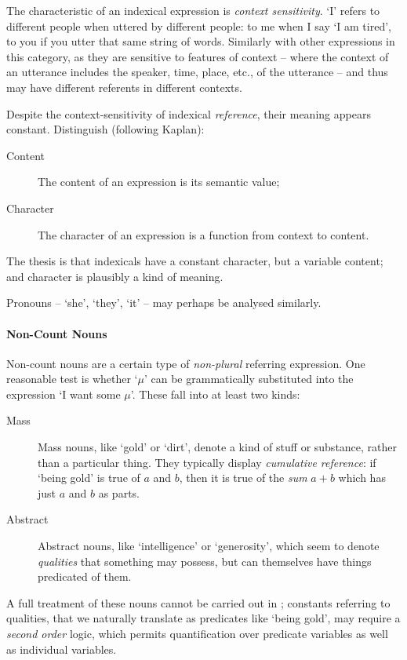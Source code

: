 The characteristic of an indexical expression is \emph{context sensitivity}. `I' refers to different people when uttered by different people: to me when I say `I am tired', to you if you utter that same string of words. Similarly with other expressions in this category, as they are sensitive to features of context – where the context of an utterance includes the speaker, time, place, etc., of the utterance – and thus may have different referents in different contexts.

Despite the context-sensitivity of indexical \emph{reference}, their meaning appears constant. Distinguish (following Kaplan):  \begin{description}
	\item [Content] The content of an expression is its semantic value;
	\item [Character] The character of an expression is a function from context to content.
\end{description} The thesis is that indexicals have a constant character, but a variable content; and character is plausibly a kind of meaning.

Pronouns – `she', `they', `it' – may perhaps be analysed similarly.




\paragraph{Non-Count Nouns}

Non-count nouns are a certain type of \emph{non-plural} referring expression. One reasonable test is whether `$\mu$'  can be grammatically substituted into the expression `I want some $\mu$'. 
 These fall into at least two kinds: \begin{description}
	\item [Mass] Mass nouns, like `gold' or `dirt', denote a kind of stuff or substance, rather than a particular thing. They typically display \emph{cumulative reference}: if `being gold' is true of $a$ and $b$, then it is true of the \emph{sum} $a+b$ which has just $a$ and $b$ as parts.
	\item [Abstract] Abstract nouns, like `intelligence' or `generosity', which seem to denote \emph{qualities} that something may possess, but can themselves have things predicated of them.  
\end{description}
A full treatment of these nouns cannot be carried out in \ltwo; constants referring to qualities, that we naturally translate as predicates like `being gold', may require a \emph{second order} logic, which permits quantification over predicate variables as well as individual variables. 





